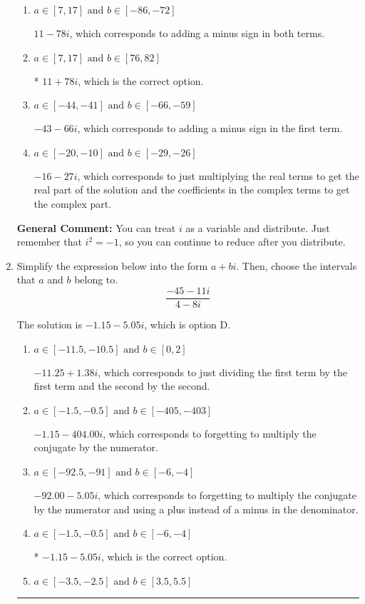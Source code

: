 \documentclass{extbook}[14pt]
\newcommand{\litem}[1]{\item #1

\rule{\textwidth}{0.4pt}}
\begin{document}
\begin{enumerate}
{\begin{enumerate}[label=\Alph*.]
 $-43 + 66 i$, which corresponds to adding a minus sign in the second term.
\item \( a \in [7, 17] \text{ and } b \in [-86, -72] \)

 $11 - 78 i$, which corresponds to adding a minus sign in both terms.
\item \( a \in [7, 17] \text{ and } b \in [76, 82] \)

* $11 + 78 i$, which is the correct option.
\item \( a \in [-44, -41] \text{ and } b \in [-66, -59] \)

 $-43 - 66 i$, which corresponds to adding a minus sign in the first term.
\item \( a \in [-20, -10] \text{ and } b \in [-29, -26] \)

 $-16 - 27 i$, which corresponds to just multiplying the real terms to get the real part of the solution and the coefficients in the complex terms to get the complex part.
\end{enumerate}

\textbf{General Comment:} You can treat $i$ as a variable and distribute. Just remember that $i^2=-1$, so you can continue to reduce after you distribute.
}
\litem{
Simplify the expression below into the form $a+bi$. Then, choose the intervals that $a$ and $b$ belong to.
\[ \frac{-45 - 11 i}{4 - 8 i} \]

The solution is \( -1.15  - 5.05 i \), which is option D.\begin{enumerate}[label=\Alph*.]
\item \( a \in [-11.5, -10.5] \text{ and } b \in [0, 2] \)

 $-11.25  + 1.38 i$, which corresponds to just dividing the first term by the first term and the second by the second.
\item \( a \in [-1.5, -0.5] \text{ and } b \in [-405, -403] \)

 $-1.15  - 404.00 i$, which corresponds to forgetting to multiply the conjugate by the numerator.
\item \( a \in [-92.5, -91] \text{ and } b \in [-6, -4] \)

 $-92.00  - 5.05 i$, which corresponds to forgetting to multiply the conjugate by the numerator and using a plus instead of a minus in the denominator.
\item \( a \in [-1.5, -0.5] \text{ and } b \in [-6, -4] \)

* $-1.15  - 5.05 i$, which is the correct option.
\item \( a \in [-3.5, -2.5] \text{ and } b \in [3.5, 5.5] \)


\end{enumerate}}
\end{enumerate}
\end{document}
